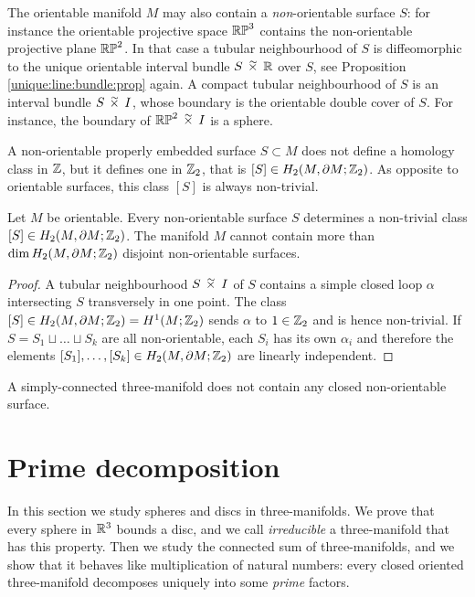 The orientable manifold $M$ may also contain a \emph{non}-orientable surface $S$: for instance the orientable projective space $\mathbb{RP}^3$ contains the non-orientable projective plane $\mathbb{RP}^2$. In that case a tubular neighbourhood of $S$ is diffeomorphic to the unique orientable interval bundle $S\timtil \matR$ over $S$, see Proposition \ref{unique:line:bundle:prop} again. A compact tubular neighbourhood of $S$ is an interval bundle $S\timtil I$, whose boundary is the orientable double cover of $S$. For instance, the boundary of $\matRP^2 \timtil I$ is a sphere.

A non-orientable properly embedded surface $S\subset M$ does not define a homology class in $\mathbb{Z}$, but it defines one in $\mathbb{Z}_2$, that is  $[S] \in H_2(M,\partial M;\mathbb{Z}_2)$. As opposite to orientable surfaces, this class $[S]$ is always non-trivial.

\begin{prop} \label{non:ori:prop}
Let $M$ be orientable. Every non-orientable surface $S$ determines a non-trivial class $[S] \in H_2(M,\partial M;\mathbb{Z}_2)$. The manifold $M$ cannot contain more than $\dim H_2(M,\partial M;\mathbb{Z}_2)$ disjoint non-orientable surfaces.
\end{prop}
\begin{proof}
A tubular neighbourhood $S\timtil I$ of $S$ contains a simple closed loop $\alpha$ intersecting $S$ transversely in one point. The class $[S] \in  H_2(M,\partial M;\mathbb{Z}_2) = H^1(M;\mathbb{Z}_2) $ sends $\alpha$ to $1\in\mathbb{Z}_2$ and is hence non-trivial. If $S=S_1\sqcup\ldots \sqcup S_k$ are all non-orientable, each $S_i$ has its own $\alpha_i$ and therefore the elements $[S_1], \ldots, [S_k] \in H_2(M,\partial M;\mathbb{Z}_2)$ are linearly independent.
\end{proof}

\begin{cor} A simply-connected three-manifold does not contain any closed non-orientable surface.
\end{cor}


\section{Prime decomposition}
In this section we study spheres and discs in three-manifolds. We prove that every sphere in $\mathbb{R}^3$ bounds a disc, and we call \emph{irreducible} a three-manifold that has this property. Then we study the connected sum of three-manifolds, and we show that it behaves like multiplication of natural numbers: every closed oriented three-manifold decomposes uniquely into some \emph{prime} factors.

